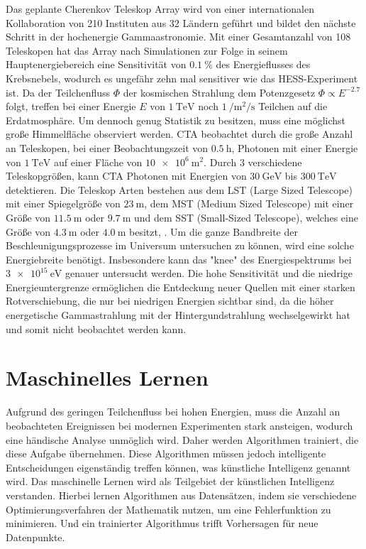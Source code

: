 Das geplante Cherenkov Teleskop Array wird von einer internationalen Kollaboration von 210 Instituten aus 32 Ländern\cite{CTA_consortium} geführt
und bildet den nächste Schritt in der hochenergie Gammaastronomie.
Mit einer Gesamtanzahl von 108 Teleskopen hat das Array nach Simulationen zur Folge in seinem Hauptenergiebereich eine Sensitivität von $\SI{0.1}{\percent}$
des Energieflusses des Krebsnebels, wodurch es ungefähr zehn mal sensitiver wie das HESS-Experiment ist\cite{CTA_paper}.
Da der Teilchenfluss $\Phi$ der kosmischen Strahlung dem Potenzgesetz $\Phi \propto E^{-2.7}$\cite[5]{Cosmic_rays} folgt,
treffen bei einer Energie $E$ von $\SI{1}{\tera\eV}$ noch $\SI{1}{\per\m\squared\per\s}$ Teilchen auf die Erdatmosphäre.
Um dennoch genug Statistik zu besitzen, muss eine möglichst große Himmelfläche observiert werden.
CTA beobachtet durch die große Anzahl an Teleskopen, bei einer Beobachtungszeit von $\SI{0.5}{\hour}$, Photonen mit einer Energie von $\SI{1}{\tera\eV}$ auf einer
Fläche von $\SI{10e6}{\m\squared}$\cite{CTA_ob}.
Durch 3 verschiedene Teleskopgrößen, kann CTA Photonen mit Energien von $\SI{30}{\giga\eV}$ bis $\SI{300}{\tera\eV}$ detektieren.
Die Teleskop Arten bestehen aus dem LST (Large Sized Telescope) mit einer Spiegelgröße von $\SI{23}{\m}$, dem MST (Medium Sized Telescope)
mit einer Größe von $\SI{11.5}{\m}$ oder $\SI{9.7}{\m}$ und dem SST (Small-Sized Telescope), welches eine Größe von $\SI{4.3}{\m}$ oder $\SI{4.0}{\m}$
besitzt, .
Um die ganze Bandbreite der Beschleunigungsprozesse im Universum untersuchen zu können, wird eine solche Energiebreite benötigt.
Insbesondere kann das "knee" des Energiespektrums bei $\SI{3e15}{\eV}$ genauer untersucht werden.
Die hohe Sensitivität und die niedrige Energieuntergrenze ermöglichen die Entdeckung neuer Quellen mit einer starken Rotverschiebung, die nur bei niedrigen
Energien sichtbar sind, da die höher energetische Gammastrahlung mit der Hintergundstrahlung wechselgewirkt hat und somit nicht beobachtet werden kann.

\section{Maschinelles Lernen}
\label{sec:ML}

Aufgrund des geringen Teilchenfluss bei hohen Energien, muss die Anzahl an beobachteten Ereignissen bei modernen
Experimenten stark ansteigen, wodurch eine händische Analyse unmöglich wird.
Daher werden Algorithmen trainiert, die diese Aufgabe übernehmen.
Diese Algorithmen müssen jedoch intelligente Entscheidungen eigenständig treffen können, was künstliche Intelligenz
genannt wird.
Das maschinelle Lernen wird als Teilgebiet der künstlichen Intelligenz verstanden. Hierbei lernen Algorithmen aus Datensätzen,
indem sie verschiedene Optimierungsverfahren der Mathematik nutzen, um eine Fehlerfunktion zu minimieren.
Und ein trainierter Algorithmus trifft Vorhersagen für neue Datenpunkte.

